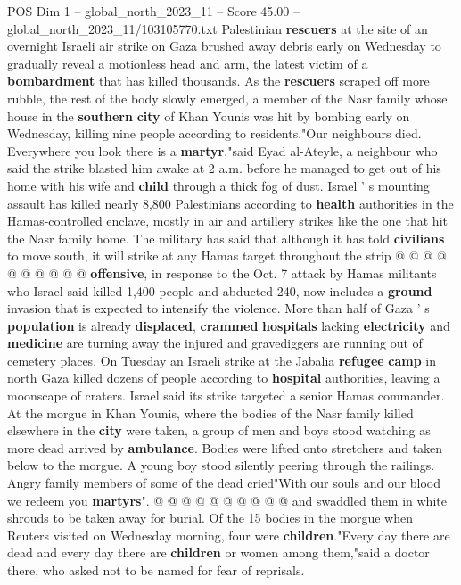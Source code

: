 \begin{textsample}{POS Dim 1 – global\_north\_2023\_11 – Score 45.00 – global\_north\_2023\_11/103105770.txt}  \label{ex:f1_pos_251}
Palestinian \textbf{rescuers} at the site of an overnight Israeli air strike on Gaza brushed away debris early on Wednesday to gradually reveal a motionless head and arm, the latest victim of a \textbf{bombardment} that has killed thousands.
As the \textbf{rescuers} scraped off more rubble, the rest of the body slowly emerged, a member of the Nasr family whose house in the \textbf{southern} \textbf{city} of Khan Younis was hit by bombing early on Wednesday, killing nine people according to residents."Our neighbours died.
Everywhere you look there is a \textbf{martyr},"said Eyad al-Ateyle, a neighbour who said the strike blasted him awake at 2 a.m. before he managed to get out of his home with his wife and \textbf{child} through a thick fog of dust.
Israel ' s mounting assault has killed nearly 8,800 Palestinians according to \textbf{health} authorities in the Hamas-controlled enclave, mostly in air and artillery strikes like the one that hit the Nasr family home.
The military has said that although it has told \textbf{civilians} to move south, it will strike at any Hamas target throughout the strip @ @ @ @ @ @ @ @ @ @ \textbf{offensive}, in response to the Oct. 7 attack by Hamas militants who Israel said killed 1,400 people and abducted 240, now includes a \textbf{ground} invasion that is expected to intensify the violence.
More than half of Gaza ' s \textbf{population} is already \textbf{displaced}, \textbf{crammed} \textbf{hospitals} lacking \textbf{electricity} and \textbf{medicine} are turning away the injured and gravediggers are running out of cemetery places.
On Tuesday an Israeli strike at the Jabalia \textbf{refugee} \textbf{camp} in north Gaza killed dozens of people according to \textbf{hospital} authorities, leaving a moonscape of craters.
Israel said its strike targeted a senior Hamas commander.
At the morgue in Khan Younis, where the bodies of the Nasr family killed elsewhere in the \textbf{city} were taken, a group of men and boys stood watching as more dead arrived by \textbf{ambulance}.
Bodies were lifted onto stretchers and taken below to the morgue.
A young boy stood silently peering through the railings.
Angry family members of some of the dead cried"With our souls and our blood we redeem you \textbf{martyrs}". @ @ @ @ @ @ @ @ @ @ and swaddled them in white shrouds to be taken away for burial.
Of the 15 bodies in the morgue when Reuters visited on Wednesday morning, four were \textbf{children}."Every day there are dead and every day there are \textbf{children} or women among them,"said a doctor there, who asked not to be named for fear of reprisals.

\end{textsample}
